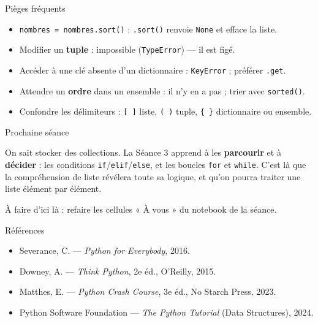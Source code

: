 \documentclass[aspectratio=169,11pt]{beamer}
\begin{document}
\begin{frame}{Pièges fréquents}
\begin{itemize}\small
  \item \texttt{nombres = nombres.sort()} : \texttt{.sort()} renvoie \texttt{None} et efface la liste.
  \item Modifier un \textbf{tuple} : impossible (\texttt{TypeError}) — il est figé.
  \item Accéder à une clé absente d'un dictionnaire : \texttt{KeyError} ; préférer \texttt{.get}.
  \item Attendre un \textbf{ordre} dans un ensemble : il n'y en a pas ; trier avec \texttt{sorted()}.
  \item Confondre les délimiteurs : \texttt{[ ]} liste, \texttt{( )} tuple, \texttt{\{ \}} dictionnaire ou ensemble.
\end{itemize}
\end{frame}

\begin{frame}{Prochaine séance}
\begin{ucaddef}
{\small On sait stocker des collections. La Séance 3 apprend à les \textbf{parcourir} et à \textbf{décider} : les conditions \texttt{if}/\texttt{elif}/\texttt{else}, et les boucles \texttt{for} et \texttt{while}. C'est là que la compréhension de liste révélera toute sa logique, et qu'on pourra traiter une liste élément par élément.}
\end{ucaddef}
{\small À faire d'ici là : refaire les cellules « À vous » du notebook de la séance.}
\end{frame}

\begin{frame}{Références}
\begin{itemize}\small
  \item Severance, C. — \emph{Python for Everybody}, 2016.
  \item Downey, A. — \emph{Think Python}, 2e éd., O'Reilly, 2015.
  \item Matthes, E. — \emph{Python Crash Course}, 3e éd., No Starch Press, 2023.
  \item Python Software Foundation — \emph{The Python Tutorial} (Data Structures), 2024.
\end{itemize}
\end{frame}
\end{document}
